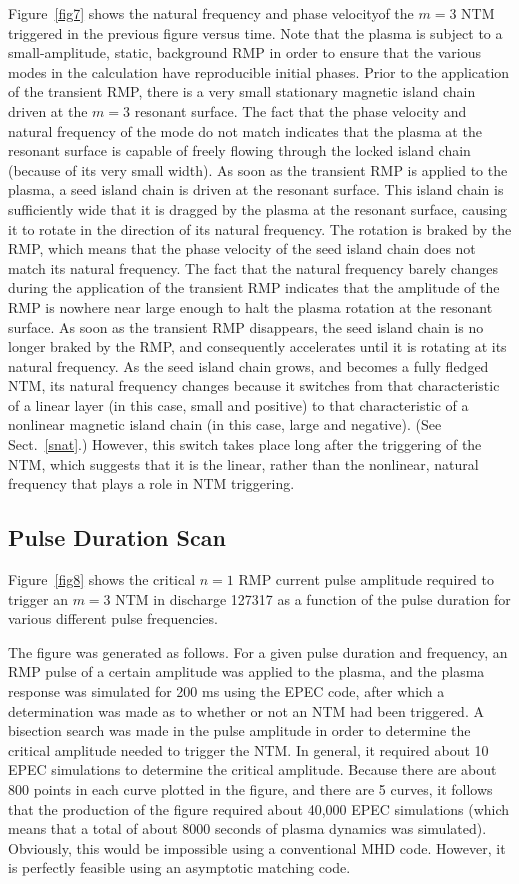 \documentclass[12pt,prb,aps]{revtex4-1}
\begin{document}
Figure~\ref{fig7} shows the natural frequency and phase velocityof the $m=3$ NTM triggered in the previous figure  versus time. Note that the plasma is subject to a small-amplitude, static, background RMP in order to ensure 
that the various modes in the calculation have reproducible initial phases. Prior to the application of the transient
RMP, there is a very small stationary magnetic island chain driven at the $m=3$ resonant surface. The fact that the
phase velocity and natural frequency of the mode do not match  indicates that the plasma at the
resonant surface is capable of freely flowing through the locked island chain (because of its very small width). As soon as the transient RMP is applied to the plasma, a seed island chain is driven at the resonant surface. This island chain is
sufficiently wide that it is dragged by the plasma at the resonant surface, causing it to rotate in the direction of its 
natural frequency. The rotation is braked by the RMP, which means that the phase velocity of the seed island chain does not
match its natural frequency. 
The fact that the natural frequency barely changes during the application of the transient RMP
indicates that the amplitude of the RMP is nowhere near large enough to halt the plasma rotation at the resonant surface. As soon as the transient RMP disappears, the seed island chain is no longer braked by the RMP, and
consequently accelerates until it is rotating at its natural frequency. As the seed island chain grows, and becomes a fully fledged NTM, its natural frequency changes because it switches from that characteristic of a linear layer (in this case, small and positive) to that characteristic of a nonlinear magnetic island chain (in this case, large and negative). (See Sect.~\ref{snat}.) However, this switch takes place long after the triggering of the NTM, which suggests that it is
the linear, rather than the nonlinear, natural frequency that plays a role in NTM triggering. 

\subsection{Pulse Duration Scan}
Figure~\ref{fig8} shows the critical $n=1$ RMP current  pulse amplitude required to trigger an $m=3$ NTM in discharge 127317 as a
function of the pulse duration for various different pulse frequencies. 

The figure was generated as follows.
For a given pulse duration and frequency, an RMP pulse of a certain amplitude was applied to the plasma, and the plasma response was simulated for 200 ms using the EPEC code, after which a determination was made as to whether or not an NTM had
been triggered. A bisection search was made in the
pulse amplitude in order to determine the critical amplitude needed to trigger the NTM. In general, it required about 10
EPEC simulations to determine the critical amplitude. Because there are about 800 points in each curve plotted in the figure, and there are 5 curves, it follows that the production of the figure required about 40,000 EPEC simulations (which means that
a total of about  8000 seconds of plasma dynamics was simulated). Obviously, this would be impossible using a
conventional MHD code. However, it is perfectly feasible using an asymptotic matching code. 
\end{document}
